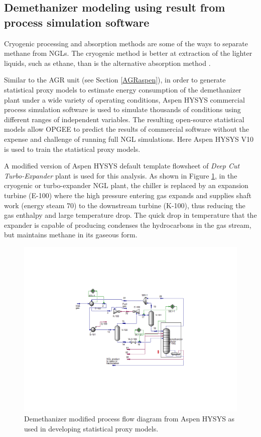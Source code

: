 \documentclass[11pt]{report}
\begin{document}
\subsection{Demethanizer modeling using result from process simulation software} \label{Demethanizer_aspen}

Cryogenic processing and absorption methods are some of the ways to separate methane from NGLs. The cryogenic method is better at extraction of the lighter liquids, such as ethane, than is the alternative absorption method \cite{roy2011aspen}. 

Similar to the AGR unit (see Section \ref{AGRaspen}), in order to generate statistical proxy models to estimate energy consumption of the demethanizer plant under a wide variety of operating conditions, Aspen HYSYS commercial process simulation software is used to simulate thousands of conditions using different ranges of independent variables. The resulting open-source statistical models allow OPGEE to predict the results of commercial software without the expense and challenge of running full NGL simulations. Here Aspen HYSYS V10 is used to train the statistical proxy models. 

A modified version of Aspen HYSYS default template flowsheet of \emph{Deep Cut Turbo-Expander} plant is used for this analysis. As shown in Figure \ref{fig:demethanizer_aspen}, in the cryogenic or turbo-expander NGL plant, the chiller is replaced by an expansion turbine (E-100) where the high pressure entering gas expands and supplies shaft work (energy steam 70) to the downstream turbine (K-100), thus reducing the gas enthalpy and large temperature drop. The quick drop in temperature that the expander is capable of producing condenses the hydrocarbons in the gas stream, but maintains methane in its gaseous form. 

\begin{figure}
\includegraphics[width=0.85\columnwidth]{images/demethanizer_aspen.pdf}
\caption{Demethanizer modified process flow diagram from Aspen HYSYS as used in developing statistical proxy models.}
\label{fig:demethanizer_aspen}
\end{figure}
\end{document}
